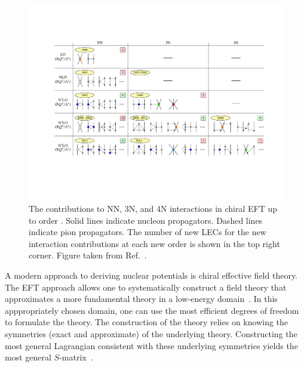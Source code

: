 \begin{figure}[t!]
  \centering
  \includegraphics[width=1.0\textwidth]{thesis/doc/images/external/table_norefs.pdf}
  \caption[
    The contributions to NN, 3N, and 4N interactions in chiral EFT
    up to order \nfourlo{}.\@
    Solid lines indicate nucleon propagators.
    Dashed lines indicate pion propagators.
    The number of new LECs for the new interaction contributions at each new order
    is shown in the top right corner.
  ]{
    The contributions to NN, 3N, and 4N interactions in chiral EFT
    up to order \nfourlo{}.\@
    Solid lines indicate nucleon propagators.
    Dashed lines indicate pion propagators.
    The number of new LECs for the new interaction contributions at each new order
    is shown in the top right corner.
    Figure taken from Ref.~\cite{Hebe20habi}.
  }\label{fig:chiefttable}
\end{figure}

A modern approach to deriving nuclear potentials is chiral effective field theory.
The EFT approach allows one to systematically construct a field theory that approximates
a more fundamental theory in a low-energy domain~\cite{Epel08chiraleft,Mach11chiraleft,Hamm19nuceftreview}.
In this apppropriately chosen domain,
one can use the most efficient degrees of freedom to formulate the theory.
The construction of the theory relies on knowing the symmetries (exact and approximate) of the underlying theory.
Constructing the most general Lagrangian consistent with these underlying symmetries
yields the most general $S$-matrix~\cite{Wein78eft}.

